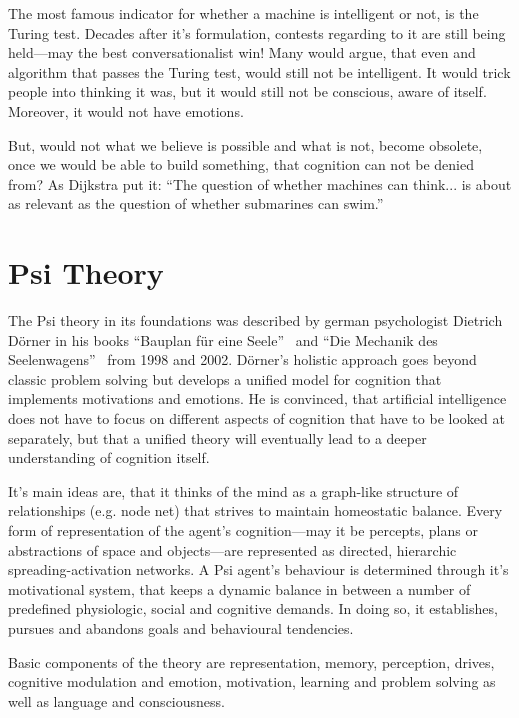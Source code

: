 The most famous indicator for whether a machine is intelligent or not, is the Turing test. Decades after it's formulation, contests regarding to it are still being held---may the best conversationalist win! Many would argue, that even and algorithm that passes the Turing test, would still not be intelligent. It would trick people into thinking it was, but it would still not be conscious, aware of itself. Moreover, it would not have emotions.~\cite{russell2009artificial}

But, would not what we believe is possible and what is not, become obsolete, once we would be able to build something, that cognition can not be denied from? As Dijkstra put it: ``The question of whether machines can think... is about as relevant as the question of whether submarines can swim.''

\section{Psi Theory}
The Psi theory in its foundations was described by german psychologist Dietrich Dörner in his books ``Bauplan für eine Seele''~\cite{Doerner1998} and ``Die Mechanik des Seelenwagens''~\cite{dorner2002mechanik} from 1998 and 2002. Dörner's holistic approach goes beyond classic problem solving but develops a unified model for cognition that implements motivations and emotions. He is convinced, that artificial intelligence does not have to focus on different aspects of cognition that have to be looked at separately, but that a unified theory will eventually lead to a deeper understanding of cognition itself.

It's main ideas are, that it thinks of the mind as a graph-like structure of relationships (e.g. node net) that strives to maintain homeostatic balance. Every form of representation of the agent's cognition---may it be percepts, plans or abstractions of space and objects---are represented as directed, hierarchic spreading-activation networks. A Psi agent's behaviour is determined through it's motivational system, that keeps a dynamic balance in between a number of predefined physiologic, social and cognitive demands. In doing so, it establishes, pursues and abandons goals and behavioural tendencies.\cite{Bach:2009:PSI:1611304}

Basic components of the theory are representation, memory, perception, drives, cognitive modulation and emotion, motivation, learning and problem solving as well as language and consciousness. %

